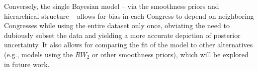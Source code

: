 Conversely, the single Bayesian model -- via the smoothness priors and  
hierarchical structure -- allows for bias in each Congress to depend on neighboring 
Congresses while using the entire dataset only once, obviating the need to dubiously subset 
the data and yielding a more accurate depiction of posterior uncertainty. 
It also allows for comparing the fit of the model to other alternatives (e.g., models using
the $RW_2$ or other smoothness priors), which will be explored in future work. 
